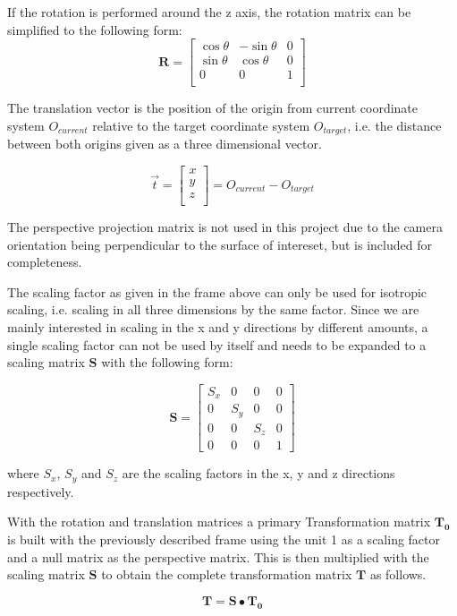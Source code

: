 If the rotation is performed around the z axis, the rotation matrix can be simplified to the following form:
$$
\mathbf{R} =
\begin{bmatrix}
\cos\theta & -\sin\theta & 0 \\
\sin\theta & \cos\theta & 0 \\
0 & 0 & 1 \\
\end{bmatrix}
$$


The translation vector is the position of the origin from current coordinate system $O_{current}$ 
relative to the target coordinate system $O_{target}$, i.e. the distance between both origins given as a three dimensional vector. 

$$
\vec{t} =
\begin{bmatrix}
x\\
y\\
z\\
\end{bmatrix}=
O_{current}-O_{target}
$$

The perspective projection matrix is not used in this project due to the camera orientation being perpendicular to the surface of intereset, but is included for completeness.

The scaling factor as given in the frame above can only be used for isotropic scaling, i.e. scaling in all three dimensions by the same factor. Since we are mainly interested in scaling in the x and y directions by different amounts, a single scaling factor can not be used by itself and needs to be expanded to a scaling matrix $\mathbf{S}$ with the following form:

$$
\mathbf{S}=
\begin{bmatrix}
S_x & 0 & 0   & 0\\
0 & S_y & 0   & 0\\
0 & 0   & S_z & 0\\
0 & 0   & 0   & 1
\end{bmatrix}
$$


where $S_x$, $S_y$ and $S_z$ are the scaling factors in the x, y and z directions respectively.

With the rotation and translation matrices a primary Transformation matrix $\mathbf{T_{0}}$ is built with the previously described frame using the unit 1 as a scaling factor and a null matrix as the perspective matrix. 
This is then multiplied with the scaling matrix $\mathbf{S}$ to obtain the complete transformation matrix $\mathbf{T}$ as follows. 

$$\mathbf{T} =  \mathbf{S} \bullet  \mathbf{T_{0}}$$

